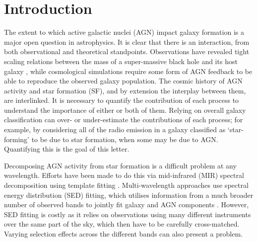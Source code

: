 \documentclass[usenatbib,fleqn,letters]{mnras}
\begin{document}
\section{Introduction}
\label{sec:intro}
The extent to which active galactic nuclei (AGN) impact galaxy formation is a major open question in astrophysics. It is clear that there is an interaction, from both observational and theoretical standpoints. Observations have revealed tight scaling relations between the mass of a super-massive black hole and its host galaxy \citep[see, e.g.][and references therein]{kormendy_coevolution_2013}, while cosmological simulations require some form of AGN feedback \citep{bower_breaking_2006,croton_many_2006} to be able to reproduce the observed galaxy population. 
The cosmic history of AGN activity and star formation (SF), and by extension the interplay between them, are interlinked. It is necessary to quantify the contribution of each process to understand the importance of either or both of them. Relying on overall galaxy classification can over- or under-estimate the contributions of each process; for example, by considering all of the radio emission in a galaxy classified as `star-forming' to be due to star formation, when some may be due to AGN. Quantifying this is the goal of this letter. 

Decomposing AGN activity from star formation is a difficult problem at any wavelength. Efforts have been made to do this via mid-infrared (MIR) spectral decomposition using template fitting \citep[e.g.,][]{laurent_mid-infrared_2000,hernan-caballero_resolving_2015,li_active_2024}. Multi-wavelength approaches use spectral energy distribution (SED) fitting, which utilises information from a much broader number of observed bands to jointly fit galaxy and AGN components \citep[e.g.][]{calistro_rivera_agnfitter_2016,boquien_cigale_2019,pacifici_art_2022}. However, SED fitting is costly as it relies on observations using many different instruments over the same part of the sky, which then have to be carefully cross-matched. Varying selection effects across the different bands can also present a problem. 
\end{document}
